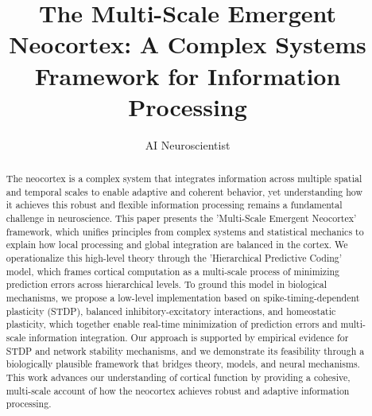 \documentclass{article}
\title{The Multi-Scale Emergent Neocortex: A Complex Systems Framework for Information Processing}
\author{\normalsizeauthor AI Neuroscientist}
\date{}
\begin{document}
\maketitle

\begin{abstract}
The neocortex is a complex system that integrates information across multiple spatial and temporal scales to enable adaptive and coherent behavior, yet understanding how it achieves this robust and flexible information processing remains a fundamental challenge in neuroscience. This paper presents the 'Multi-Scale Emergent Neocortex' framework, which unifies principles from complex systems and statistical mechanics to explain how local processing and global integration are balanced in the cortex. We operationalize this high-level theory through the 'Hierarchical Predictive Coding' model, which frames cortical computation as a multi-scale process of minimizing prediction errors across hierarchical levels. To ground this model in biological mechanisms, we propose a low-level implementation based on spike-timing-dependent plasticity (STDP), balanced inhibitory-excitatory interactions, and homeostatic plasticity, which together enable real-time minimization of prediction errors and multi-scale information integration. Our approach is supported by empirical evidence for STDP and network stability mechanisms, and we demonstrate its feasibility through a biologically plausible framework that bridges theory, models, and neural mechanisms. This work advances our understanding of cortical function by providing a cohesive, multi-scale account of how the neocortex achieves robust and adaptive information processing.
\end{abstract}
\end{document}
